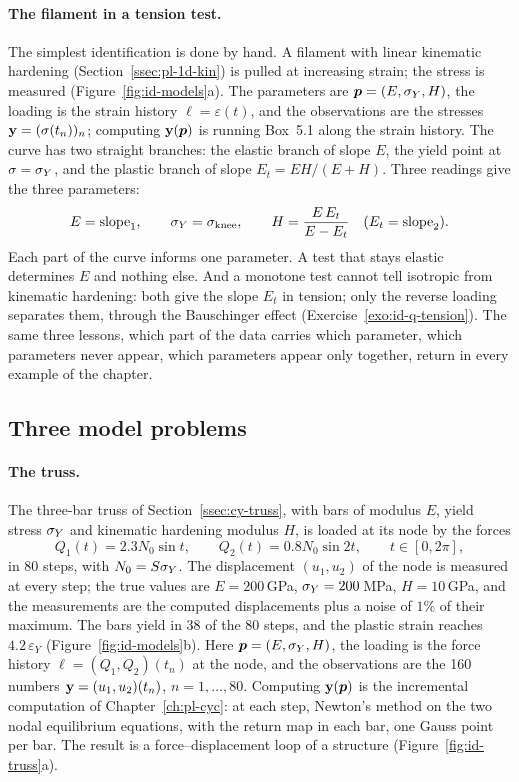 \paragraph{The filament in a tension test.}
%
The simplest identification is done by hand. A filament with linear
kinematic hardening (Section~\ref{ssec:pl-1d-kin}) is pulled at increasing
strain; the stress is measured (Figure~\ref{fig:id-models}a). The parameters are
$\bm{p}=(E,\sigma_{Y},H)$, the loading is the strain history $\ell=\varepsilon(t)$, and the
observations are the stresses $\mathbf{y}=(\sigma(t_n))_n$; computing $\mathbf{y}(\bm{p})$ is
running Box~5.1 along the strain history. The curve has two straight branches: the
elastic branch of slope $E$, the yield point at $\sigma=\sigma_{Y}$, and the plastic
branch of slope $E_t=EH/(E+H)$. Three readings give the three parameters:
\[
  E=\text{slope}_1,\qquad \sigma_{Y}=\sigma_{\text{knee}},\qquad
  H=\frac{E\,E_t}{E-E_t}\quad(E_t=\text{slope}_2).
\]
Each part of the curve informs one parameter. A test that stays elastic
determines $E$ and nothing else. And a monotone test cannot tell isotropic
from kinematic hardening: both give the slope $E_t$ in tension; only the
reverse loading separates them, through the Bauschinger effect
(Exercise~\ref{exo:id-q-tension}). The same three lessons, which part of the
data carries which parameter, which parameters never appear, which
parameters appear only together, return in every example of the chapter.

\subsection{Three model problems}\label{ssec:id-models}
%
\paragraph{The truss.}
%
The three-bar truss of Section~\ref{ssec:cy-truss}, with bars of modulus $E$,
yield stress $\sigma_{Y}$ and kinematic hardening modulus $H$, is loaded at its node
by the forces
\[
  Q_1(t)=2.3N_0\sin t,\qquad Q_2(t)=0.8N_0\sin2t,\qquad t\in[0,2\pi],
\]
in 80 steps, with $N_0=S\sigma_{Y}$. The displacement $(u_1,u_2)$ of the node is
measured at every step; the true values are $E=200$\,GPa, $\sigma_{Y}=200$\,MPa,
$H=10$\,GPa, and the measurements are the computed displacements plus a noise
of $1\%$ of their maximum. The bars yield in 38 of the 80 steps, and the plastic
strain reaches $4.2\,\varepsilon_Y$ (Figure~\ref{fig:id-models}b). Here
$\bm{p}=(E,\sigma_{Y},H)$, the loading is the force history $\ell=(Q_1,Q_2)(t_n)$ at the
node, and the observations are the 160 numbers $\mathbf{y}=(u_1,u_2)(t_n)$,
$n=1,\dots,80$. Computing $\mathbf{y}(\bm{p})$ is the incremental computation of
Chapter~\ref{ch:pl-cyc}: at each step, Newton's method on the two nodal
equilibrium equations, with the return map in each bar, one Gauss point per bar.
The result is a force--displacement loop of a structure
(Figure~\ref{fig:id-truss}a).

